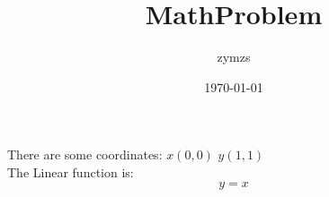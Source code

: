 \documentclass{article}
\title{MathProblem}
\author{zymzs}
\date{\today}
\begin{document}
	\maketitle
	There are some coordinates: $ x(0, 0) $ $ y(1, 1) $ \\
	The Linear function is: $$ y=x $$
\end{document}
